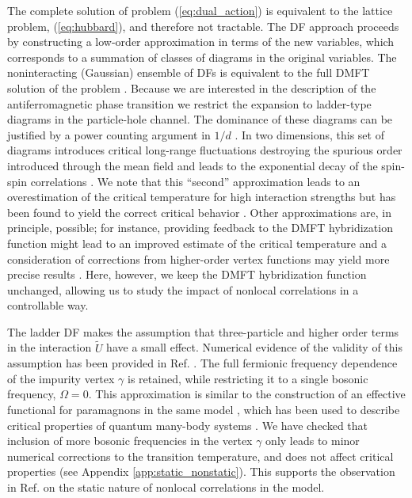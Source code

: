 \documentclass[aps,prb,twocolumn,amsmath,notitlepage,floatfix,footinbib,superscriptaddress,showpacs, showkeys]{revtex4-1}
\begin{document}
The complete solution of problem (\ref{eq:dual_action}) is equivalent to the lattice problem, (\ref{eq:hubbard}), and therefore not tractable. The DF approach proceeds by constructing a low-order approximation in terms of the new variables, which corresponds to a summation of classes of diagrams in the original variables. The noninteracting (Gaussian) ensemble of DFs is equivalent to the full DMFT solution of the problem \cite{Rubtsov2009}.
Because we are interested in the description of the antiferromagnetic phase transition we restrict the expansion to ladder-type diagrams in the particle-hole channel. The dominance of these diagrams can be justified by a power counting argument in $1/d$ \cite{Otsuki2014}. In two dimensions, this set of diagrams introduces critical long-range fluctuations destroying the spurious order introduced through the mean field and leads to the exponential decay of the spin-spin correlations \cite{Otsuki2014}.
We note that this ``second'' approximation leads to an overestimation of the critical temperature for high interaction strengths but has been found to yield the correct critical behavior \cite{Antipov2014}. Other approximations are, in principle, possible; for instance, providing feedback to the DMFT hybridization function might lead to an improved estimate of the critical temperature \cite{Otsuki2014} and a consideration of corrections from higher-order vertex functions may yield more precise results \cite{Katanin2013}. Here, however, we keep the DMFT hybridization function unchanged, allowing us to study the impact of nonlocal correlations in a controllable way.

The ladder DF makes the assumption that three-particle and higher order terms in the interaction $\tilde{U}$ have a small effect. Numerical evidence of the validity of this assumption has been provided in Ref. .
The full fermionic frequency dependence of the impurity vertex $\gamma$ is retained, while restricting it to a single bosonic frequency, $\Omega = 0$. This approximation is similar to the construction of an effective functional for paramagnons in the same model \cite{Hertz1974}, which has been used to describe critical properties of quantum many-body systems \cite{Hertz1976}. 
We have checked that inclusion of more bosonic frequencies in the vertex $\gamma$ only leads to minor numerical corrections to the transition temperature, and does not affect critical properties (see Appendix \ref{app:static_nonstatic}). This supports the observation in Ref.  on the static nature of nonlocal correlations in the model.
\end{document}
